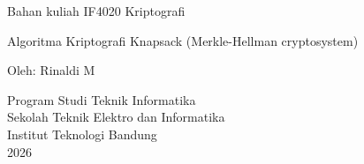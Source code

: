 \documentclass{article}
\begin{document}

\begin{center}
Bahan kuliah IF4020 Kriptografi

{\huge \color{red} Algoritma Kriptografi Knapsack}
{\Large \color{red} (Merkle-Hellman cryptosystem)}

\vspace{20mm}

Oleh: Rinaldi M

\vspace{10mm}

Program Studi Teknik Informatika\\
Sekolah Teknik Elektro dan Informatika\\
Institut Teknologi Bandung\\
2026
\end{center}
\end{document}
